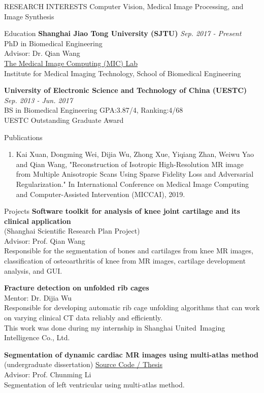 \documentclass{resume} %
\begin{document}
\begin{rSection}{RESEARCH INTERESTS}
Computer Vision, Medical Image Processing, and Image Synthesis
\end{rSection}

\begin{rSection}{Education}
{\bf Shanghai Jiao Tong University (SJTU)}
\hfill {\em Sep. 2017 - Present} \\
PhD in Biomedical Engineering  \\
Advisor: Dr. Qian Wang \\
\href{http://mic.sjtu.edu.cn/}{The Medical Image Computing (MIC) Lab} \\
Institute for Medical Imaging Technology, School of Biomedical Engineering

{\bf University of Electronic Science and Technology of China (UESTC)}
\hfill {\em Sep. 2013 - Jun. 2017}
\\ BS in Biomedical Engineering \hfill {GPA:3.87/4, Ranking:4/68}
\\ UESTC Outstanding Graduate Award 
\end{rSection}

\begin{rSection}{Publications} 
\begin{enumerate}
\item Kai Xuan, Dongming Wei, Dijia Wu, Zhong Xue, Yiqiang Zhan, Weiwu Yao and Qian Wang, "Reconstruction of Isotropic High-Resolution MR image from Multiple Anisotropic Scans Using Sparse Fidelity Loss and Adversarial Regularization." In International Conference on Medical Image Computing and Computer-Assisted Intervention (MICCAI), 2019.
\end{enumerate}
\end{rSection}

\begin{rSection}{Projects}
{\bf Software toolkit for analysis of knee joint cartilage and its clinical application}\\
(Shanghai Scientific Research Plan Project)\\
Advisor: Prof. Qian Wang \\
Responsible for the segmentation of bones and cartilages from knee MR images, classification of osteoarthritis of knee from MR images, cartilage development analysis, and GUI.

{\bf Fracture detection on unfolded rib cages} \\
Mentor: Dr. Dijia Wu \\
Responsible for developing automatic rib cage unfolding algorithms
that can work on varying clinical CT data reliably and efficiently. \\
This work was done during my internship in Shanghai United~Imaging Intelligence Co., Ltd.

{\bf Segmentation of dynamic cardiac MR images using multi-atlas method} \\
(undergraduate dissertation)
\href{https://github.com/woxuankai/cardiacMRISeg/}{Source Code / Thesis} \\
Advisor: Prof. Chunming Li \\
Segmentation of left ventricular using multi-atlas method.


\end{rSection}
\end{document}
